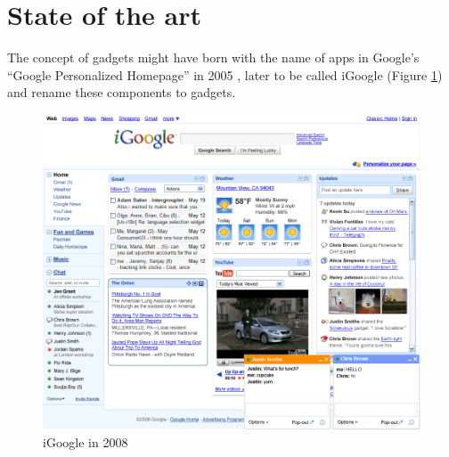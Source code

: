 \newpage
\section{State of the art}

The concept of gadgets might have born with the name of apps in Google's ``Google Personalized Homepage'' in 2005 \cite{ref:what_happened_to_igoogle}, later to be called iGoogle (Figure \ref{fig:igoogle_2008}) and rename these components to gadgets.

\begin{figure}[h]
  \center
    \includegraphics[keepaspectratio, scale=0.6]{Media/Captures/Soa/iGoogle.png}
  \caption{iGoogle in 2008}
  \label{fig:igoogle_2008}
\end{figure}

